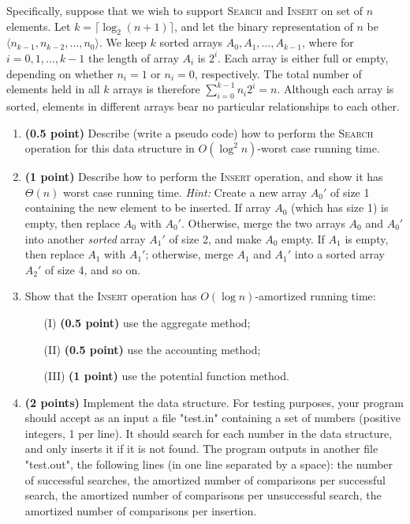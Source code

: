 \documentclass{article}
\begin{document}
Specifically, suppose that we wish to support \textsc{Search} and \textsc{Insert} on  set of $n$ elements. Let $k=\lceil\log_2(n+1)\rceil$, and let the binary representation of $n$ be  
$\langle n_{k-1},n_{k-2},\ldots,n_0\rangle$. We keep $k$ sorted arrays $A_0,A_1,\ldots,A_{k-1}$, where for $i=0,1,\ldots,k-1$ the length of array $A_i$ is $2^i$. Each array is either full or empty, depending on whether $n_i=1$ or $n_i=0$, respectively. The total number of elements held in all $k$ arrays is therefore $\sum_{i=0}^{k-1}n_i2^i=n$. Although each array is sorted, elements in different arrays bear no particular relationships to each other.
 \begin{enumerate}
\item \textbf{(0.5 point)} Describe (write a pseudo code) how to perform the \textsc{Search} operation for this data structure in $O(\log ^2 n)$-worst case running time. 

\item \textbf{(1 point)} Describe how to perform the \textsc{Insert} operation, and show it has $\Theta(n)$ worst case running time.
{\it Hint:} Create a new array $A_0'$ of size 1 containing the new element to be inserted. If array $A_0$ (which has size 1) is empty, then replace $A_0$ with $A_0'$. Otherwise, merge the two arrays $A_0$ and $A_0'$ into another {\it sorted} array $A_1'$ of size 2, and make $A_0$ empty. If $A_1$ is empty, then replace $A_1$ with $A_1'$; otherwise, merge $A_1$ and $A_1'$ into a sorted array $A_2'$ of size 4, and so on.
\item Show that the \textsc{Insert} operation has $O(\log n)$-amortized running time:
\begin{itemize}
\item[(I)] \textbf{(0.5 point)} use the aggregate method;
\item[(II)] \textbf{(0.5 point)} use the accounting method;
\item [(III)] \textbf{(1 point)} use the potential function method.
\end{itemize}
\item \textbf{(2 points)} Implement the data structure. For testing purposes, your program should accept as an input a file "test.in" containing a set of numbers (positive integers, 1 per line). It should search for each number in the data structure, and only inserts it if it is not found. The program outputs in another file "test.out", the following lines (in one line separated by a space): the number of successful searches, the amortized number of comparisons per successful search, the amortized number of comparisons per unsuccessful search, the amortized number of comparisons per insertion.   
\end{enumerate}
 
\end{document}
